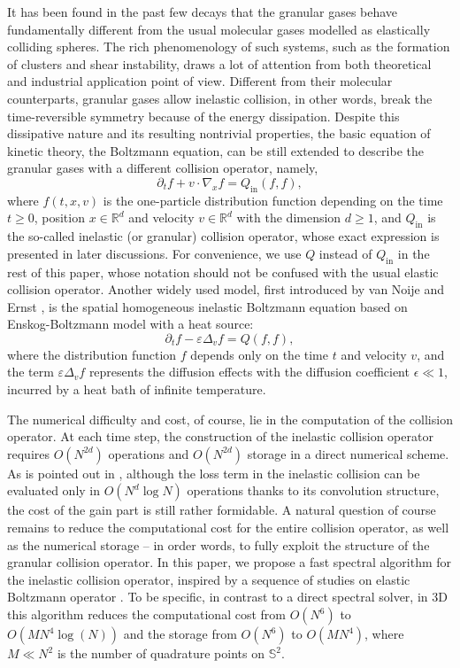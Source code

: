 \documentclass[review, times]{elsarticle}
\begin{document}
It has been found in the past few decays that the granular gases behave fundamentally different from the usual molecular gases modelled as elastically colliding spheres. The rich phenomenology of such systems, such as the formation of clusters and shear instability, draws a lot of attention from both theoretical and industrial application point of view. Different from their molecular counterparts, granular gases allow inelastic collision, in other words, break the time-reversible symmetry because of the energy dissipation. Despite this dissipative nature and its resulting nontrivial properties, the basic equation of kinetic theory, the Boltzmann equation, can be still extended to describe the granular gases with a different collision operator, namely,
\begin{equation}
\partial_t f + v \cdot \nabla_x f = Q_{\text{in}}(f,f),
\label{boltz}
\end{equation}
where $f(t,x,v)$ is the one-particle distribution function depending on the time $t \geq 0$, position $x \in \mathbb{R}^d$ and velocity $v \in \mathbb{R}^d$ with the dimension $d \geq 1$, and $Q_{\text{in}}$ is the so-called inelastic (or granular) collision operator, whose exact expression is presented in later discussions. For convenience, we use $Q$ instead of $Q_{\text{in}}$ in the rest of this paper, whose notation should not be confused with the usual elastic collision operator. Another widely used model, first introduced by van Noije and Ernst \cite{noije}, is the spatial homogeneous inelastic Boltzmann equation based on Enskog-Boltzmann model with a heat source:
\begin{equation} \label{inBoltz}
\partial_tf-\varepsilon \Delta_vf=Q(f,f),
\end{equation}
where the distribution function $f$ depends only on the time $t$ and velocity $v$, and the term $\varepsilon \Delta_vf$ represents the diffusion effects with the diffusion coefficient $\epsilon \ll 1$, incurred by a heat bath of infinite temperature. 

The numerical difficulty and cost, of course, lie in the computation of the collision operator. At each time step, the construction of the inelastic collision operator requires $O(N^{2d})$ operations and $O(N^{2d})$ storage in a direct numerical scheme. As is pointed out in \cite{filbet2005}, although the loss term in the inelastic collision can be evaluated only in $O(N^d \log N)$ operations thanks to its convolution structure, the cost of the gain part is still rather formidable. A natural question of course remains to reduce the computational cost for the entire collision operator, as well as the numerical storage -- in order words, to fully exploit the structure of the granular collision operator. In this paper, we propose a fast spectral algorithm for the inelastic collision operator, inspired by a sequence of studies on elastic Boltzmann operator \cite{fast1999, mouhot2006fast, hu2012fast, gamba_hu}. To be specific, in contrast to a direct spectral solver, in 3D this algorithm reduces the computational cost from $O(N^{6})$ to $O\left(MN^{4}\log(N)\right)$ and the storage from $O(N^{6})$ to $O(MN^{4})$, where $M \ll N^{2}$ is the number of quadrature points on $\mathbb{S}^{2}$. 
\end{document}
